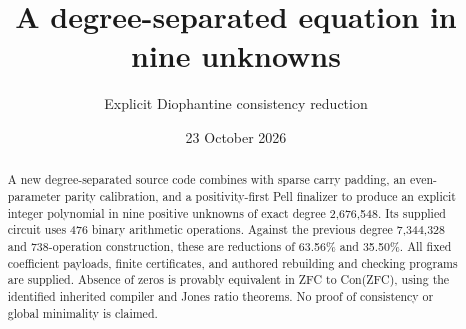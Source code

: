 \documentclass[11pt]{article}
\title{A degree-separated equation in nine unknowns}
\author{Explicit Diophantine consistency reduction}
\date{23 October 2026}
\begin{document}
\maketitle
\begin{abstract}
A new degree-separated source code combines with sparse carry padding,
an even-parameter parity calibration, and a positivity-first Pell finalizer
to produce an explicit integer polynomial in nine positive unknowns of exact
degree 2,676,548.  Its supplied circuit uses 476 binary arithmetic operations.
Against the previous degree 7,344,328 and 738-operation construction, these are
reductions of 63.56\% and 35.50\%.  All fixed coefficient payloads, finite
certificates, and authored rebuilding and checking programs are supplied.
Absence of zeros is provably equivalent in ZFC to Con(ZFC), using the
identified inherited compiler and Jones ratio theorems.  No proof of
consistency or global minimality is claimed.
\end{abstract}

\end{document}
